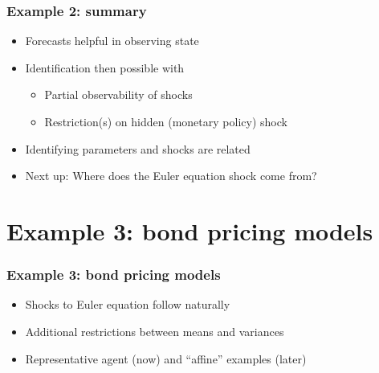 \documentclass{beamer}
\begin{document}
\begin{frame}
\frametitle{Example 2:  summary}
\begin{itemize} \itemsep=\bigskipamount
\item Forecasts helpful in observing state
\item Identification then possible with \\
\begin{itemize}
\item Partial observability of shocks
\item Restriction(s) on hidden (monetary policy) shock
\end{itemize}
\item Identifying parameters and shocks are related
\item Next up:  Where does the Euler equation shock come from?
\end{itemize}
\end{frame}

\section{Example 3: bond pricing models}
\begin{frame}
\frametitle{Example 3:  bond pricing models}
\begin{itemize} \itemsep=\bigskipamount
\item Shocks to Euler equation follow naturally
\item Additional restrictions between means and variances
\item Representative agent (now) and ``affine'' examples (later)
\end{itemize}
\end{frame}
\end{document}
